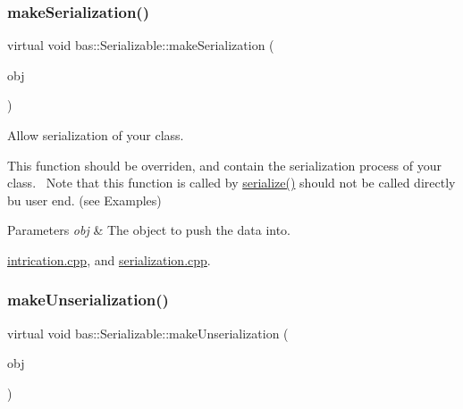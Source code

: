 \subsubsection{\texorpdfstring{makeSerialization()}{makeSerialization()}}
{\footnotesize\ttfamily virtual void bas\+::\+Serializable\+::make\+Serialization (\begin{DoxyParamCaption}\item[{\mbox{\hyperlink{classbas_1_1SerializedObject}{Serialized\+Object}} \&}]{obj }\end{DoxyParamCaption})\hspace{0.3cm}{\ttfamily [pure virtual]}}



Allow serialization of your class. 

This function should be overriden, and contain the serialization process of your class.~\newline
 Note that this function is called by \mbox{\hyperlink{classbas_1_1Serializable_a8b05e1e79cc281aa687c12b5786c2af3}{serialize()}} should not be called directly bu user end. (see Examples) 
\begin{DoxyParams}{Parameters}
{\em obj} & The object to push the data into. \\
\hline
\end{DoxyParams}
\begin{Desc}
\item[Examples]\par
\mbox{\hyperlink{intrication_8cpp-example}{intrication.\+cpp}}, and \mbox{\hyperlink{serialization_8cpp-example}{serialization.\+cpp}}.\end{Desc}
\mbox{\label{classbas_1_1Serializable_af46002b3532fb719fa47e1d7cc731dd2}} 
\subsubsection{\texorpdfstring{makeUnserialization()}{makeUnserialization()}}
{\footnotesize\ttfamily virtual void bas\+::\+Serializable\+::make\+Unserialization (\begin{DoxyParamCaption}\item[{\mbox{\hyperlink{classbas_1_1SerializedObject}{Serialized\+Object}} \&}]{obj }\end{DoxyParamCaption})\hspace{0.3cm}{\ttfamily [pure virtual]}}



